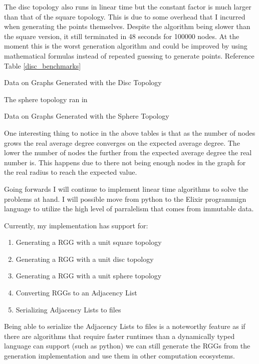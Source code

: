 \documentclass{article}
\begin{document}
	The disc topology also runs in linear time but the constant factor is much larger than that of the square topology.
	This is due to some overhead that I incurred when generating the points themselves.
	Despite the algorithm being slower than the square version, it still terminated in 48 seconds for 100000 nodes.
  At the moment this is the worst generation algorithm and could be improved by using mathematical formulas instead of repeated guessing to generate points.
  Reference Table \ref{disc_benchmarks}

  \begin{center}
	  \begin{table}
      \label{disc_benchmarks}
			\caption{Data on Graphs Generated with the Disc Topology}
		\end{table}
	\end{center}

  The sphere topology ran in

  \begin{center}
	  \begin{table}[H]
			\caption{Data on Graphs Generated with the Sphere Topology}
		\end{table}
	\end{center}

	One interesting thing to notice in the above tables is that as the number of nodes grows the real average degree converges on the expected average degree.
	The lower the number of nodes the further from the expected average degree the real number is.
	This happens due to there not being enough nodes in the graph for the real radius to reach the expected value.

	Going forwards I will continue to implement linear time algorithms to solve the problems at hand.
	I will possible move from python to the Elixir programmign language to utilize the high level of parralelism that comes from immutable data.

  Currently, my implementation has support for:
  \begin{enumerate}
		\item Generating a RGG with a unit square topology
		\item Generating a RGG with a unit disc topology
    \item Generating a RGG with a unit sphere topology
		\item Converting RGGs to an Adjacency List
		\item Serializing Adjacency Lists to files
  \end{enumerate}
  Being able to serialize the Adjacency Lists to files is a noteworthy feature as if there are algorithms that require faster runtimes than a dynamically typed language can support (such as python) we can still generate the RGGs from the generation implementation  and use them in other computation ecosystems.
\end{document}

